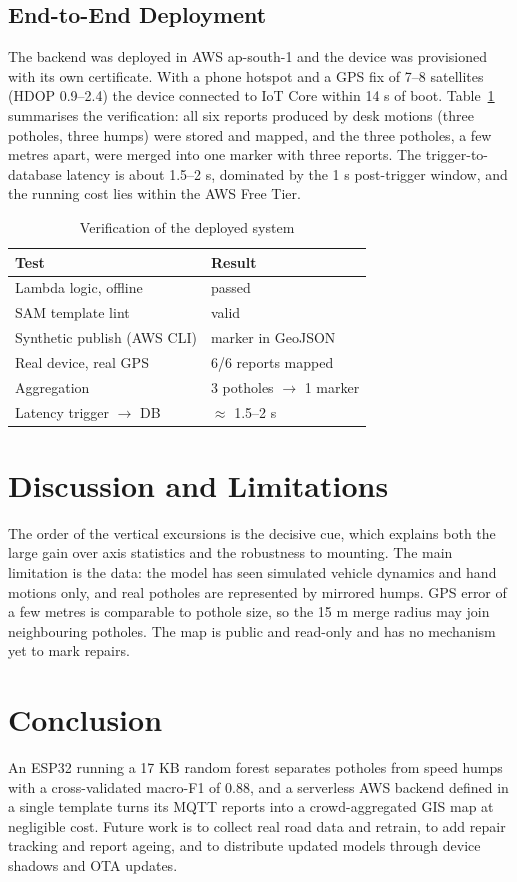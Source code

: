 \documentclass[conference]{IEEEtran}
\begin{document}
\subsection{End-to-End Deployment}
The backend was deployed in AWS ap-south-1 and the device was provisioned with its own certificate. With a phone hotspot and a GPS fix of 7--8 satellites (HDOP 0.9--2.4) the device connected to IoT Core within 14 s of boot. Table~\ref{tab:verif} summarises the verification: all six reports produced by desk motions (three potholes, three humps) were stored and mapped, and the three potholes, a few metres apart, were merged into one marker with three reports. The trigger-to-database latency is about 1.5--2 s, dominated by the 1 s post-trigger window, and the running cost lies within the AWS Free Tier.

\begin{table}[t]
\caption{Verification of the deployed system}
\label{tab:verif}
\centering
\footnotesize
\begin{tabular}{ll}
\hline
\textbf{Test} & \textbf{Result} \\
\hline
Lambda logic, offline & passed \\
SAM template lint & valid \\
Synthetic publish (AWS CLI) & marker in GeoJSON \\
Real device, real GPS & 6/6 reports mapped \\
Aggregation & 3 potholes $\rightarrow$ 1 marker \\
Latency trigger $\rightarrow$ DB & $\approx$ 1.5--2 s \\
\hline
\end{tabular}
\end{table}

\section{Discussion and Limitations}
The order of the vertical excursions is the decisive cue, which explains both the large gain over axis statistics and the robustness to mounting. The main limitation is the data: the model has seen simulated vehicle dynamics and hand motions only, and real potholes are represented by mirrored humps. GPS error of a few metres is comparable to pothole size, so the 15 m merge radius may join neighbouring potholes. The map is public and read-only and has no mechanism yet to mark repairs.

\section{Conclusion}
An ESP32 running a 17 KB random forest separates potholes from speed humps with a cross-validated macro-F1 of 0.88, and a serverless AWS backend defined in a single template turns its MQTT reports into a crowd-aggregated GIS map at negligible cost. Future work is to collect real road data and retrain, to add repair tracking and report ageing, and to distribute updated models through device shadows and OTA updates.
\end{document}
